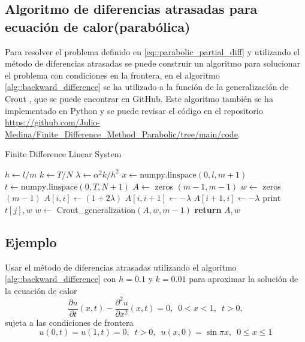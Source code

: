 \documentclass[a4paper]{article}
\begin{document}
\subsection{Algoritmo de diferencias atrasadas para ecuación de calor(parabólica)}
Para resolver el problema definido en \ref{eq::parabolic_partial_diff} y utilizando el método de diferencias atrasadas se puede construir un algoritmo para solucionar el problema con condiciones en la frontera, en el algoritmo \ref{alg::backward_difference} se ha utilizado a la función de la generalización de Crout \cite{Medina}, que se puede encontrar en GitHub. Este algoritmo también se ha implementado en Python y se puede revisar el código en el repositorio
\url{https://github.com/Julio-Medina/Finite_Difference_Method_Parabolic/tree/main/code}.
\begin{algorithm}[H]
\caption{Finite Difference Linear System}\label{alg::backward_difference}
\begin{algorithmic}[H]
\State $h \gets l/m$
\State $k \gets T/N$
\State $\lambda \gets \alpha^2 k /h^2$
\State $x\gets \text{numpy.linspace}(0, l, m+1)$
\State $t \gets \text{numpy.linspace}(0, T, N+1)$
\State $A \gets$ zeros $(m-1,m-1)$
\State $w \gets$ zeros $(m-1)$
\State $A[i,i]\gets (1+2\lambda)$
\State $A[i,i+1]\gets-\lambda$
\State $A[i+1,i]\gets-\lambda$
\EndIf
\EndFor
{}
\State print $t[j],w$
\State $w \gets$ Crout\_generalization$(A,w,m-1)$
\EndFor
\State \textbf{return} $A, w$
\EndFunction
\end{algorithmic}
\end{algorithm}
\subsection{Ejemplo}
Usar el método de diferencias atrasadas utilizando el algoritmo \ref{alg::backward_difference} con $h=0.1$ y $k=0.01$ para aproximar la solución de la ecuación de calor
\begin{equation}
\frac{\partial u}{\partial t}(x,t) -\frac{\partial^2 u}{\partial x ^2}(x,t)=0, \,\,\, 0<x<1,\,\,\, t>0,
\end{equation}
sujeta a las condiciones de frontera
\begin{equation*}
u(0,t)=u(1,t)=0,\,\,\, t>0,\,\,\,u(x,0)=\sin{\pi x},\,\,\, 0\leq x \leq 1
\end{equation*}
\end{document}
